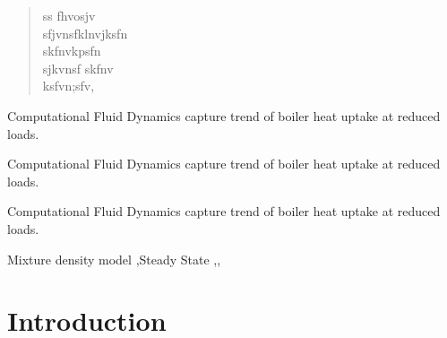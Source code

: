 \documentclass[a4paper,fleqn]{cas-dc}
\begin{document}


\begin{abstract}
ss fhvosjv \\
sfjvnsfklnvjksfn\\
skfnvkpsfn \\
sjkvnsf skfnv\\
ksfvn;sfv,  
\end{abstract}


\begin{highlights}
\item Computational Fluid Dynamics capture trend of boiler heat uptake at reduced loads.
\item Computational Fluid Dynamics capture trend of boiler heat uptake at reduced loads.
\item Computational Fluid Dynamics capture trend of boiler heat uptake at reduced loads.
\end{highlights}

\begin{keywords}
Mixture density model \sep Steady State \sep \sep
\end{keywords}

\maketitle

\section{Introduction}\label{intro}


\end{document}
